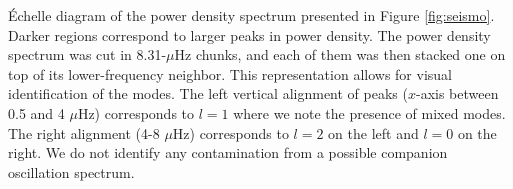 \label{fig:echelle} \'Echelle diagram of the power density spectrum presented in Figure \ref{fig:seismo}. Darker regions correspond to larger peaks in power density. The power density spectrum was cut in 8.31-$\mu$Hz chunks, and each of them was then stacked one on top of its lower-frequency neighbor. This representation allows for visual identification of the modes. The left vertical alignment of peaks ($x$-axis between 0.5 and 4 $\mu$Hz) corresponds to $l=1$ where we note the presence of mixed modes. The right alignment (4-8 $\mu$Hz) corresponds to $l=2$ on the left and $l=0$ on the right. We do not identify any contamination from a possible companion oscillation spectrum.
